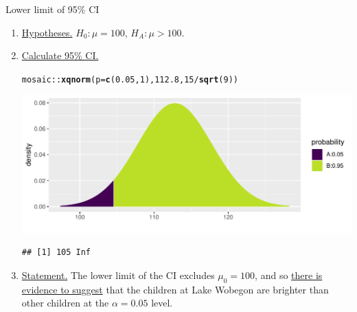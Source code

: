 \documentclass[10pt,handout]{beamer}\usepackage[]{graphicx}\usepackage[]{color}
\makeatletter
\def\maxwidth{ %
  \ifdim\Gin@nat@width>\linewidth
    \linewidth
  \else
    \Gin@nat@width
  \fi
}
\newcommand{\hlnum}[1]{\textcolor[rgb]{0.686,0.059,0.569}{#1}}%
\newcommand{\hlopt}[1]{\textcolor[rgb]{0,0,0}{#1}}%
\newcommand{\hlstd}[1]{\textcolor[rgb]{0.345,0.345,0.345}{#1}}%
\newcommand{\hlkwc}[1]{\textcolor[rgb]{0.333,0.667,0.333}{#1}}%
\newcommand{\hlkwd}[1]{\textcolor[rgb]{0.737,0.353,0.396}{\textbf{#1}}}%
\newenvironment{kframe}{%
 \def\at@end@of@kframe{}%
 \ifinner\ifhmode%
  \def\at@end@of@kframe{\end{minipage}}%
  \begin{minipage}{\columnwidth}%
 \fi\fi%
 \def\FrameCommand##1{\hskip\@totalleftmargin \hskip-\fboxsep
 \colorbox{shadecolor}{##1}\hskip-\fboxsep
     \hskip-\linewidth \hskip-\@totalleftmargin \hskip\columnwidth}%
 \MakeFramed {\advance\hsize-\width
   \@totalleftmargin\z@ \linewidth\hsize
   \@setminipage}}%
 {\par\unskip\endMakeFramed%
 \at@end@of@kframe}
\newenvironment{knitrout}{}{} %
\makeatother
\begin{document}
\begin{frame}[fragile]{Lower limit of 95\% CI}
	\small
	\begin{enumerate}
		\item \underline{Hypotheses.} $H_0: \mu = 100$, $H_A: \mu > 100$.
		\item \underline{Calculate 95\% CI.}
\begin{knitrout}\tiny
{}\color{fgcolor}\begin{kframe}
\begin{alltt}
\hlstd{mosaic}\hlopt{::}\hlkwd{xqnorm}\hlstd{(}\hlkwc{p} \hlstd{=} \hlkwd{c}\hlstd{(}\hlnum{0.05}\hlstd{,}\hlnum{1}\hlstd{),} \hlnum{112.8}\hlstd{,} \hlnum{15}\hlopt{/}\hlkwd{sqrt}\hlstd{(}\hlnum{9}\hlstd{))}
\end{alltt}
\end{kframe}

{\centering \includegraphics[width=\maxwidth]{figure/unnamed-chunk-17-1} 

}


\begin{kframe}\begin{verbatim}
## [1] 105 Inf
\end{verbatim}
\end{kframe}
\end{knitrout}
		\pause 
		\item \underline{Statement.} The lower limit of the CI excludes $\mu_0=100$, and so \underline{there is evidence to suggest} that the children at Lake Wobegon are brighter than other children at the $\alpha=0.05$ level.
	\end{enumerate}
	
\end{frame}
\end{document}
